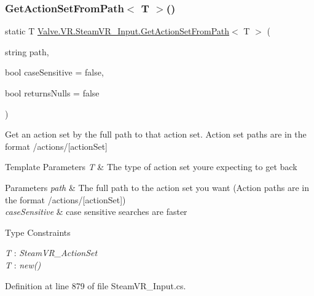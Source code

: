 \subsubsection{\texorpdfstring{GetActionSetFromPath$<$ T $>$()}{GetActionSetFromPath< T >()}}
{\footnotesize\ttfamily static T \mbox{\hyperlink{class_valve_1_1_v_r_1_1_steam_v_r___input_ae8457bd35fd6eb86e62371d56af44254}{Valve.\+V\+R.\+Steam\+V\+R\+\_\+\+Input.\+Get\+Action\+Set\+From\+Path}}$<$ T $>$ (\begin{DoxyParamCaption}\item[{string}]{path,  }\item[{bool}]{case\+Sensitive = {\ttfamily false},  }\item[{bool}]{returns\+Nulls = {\ttfamily false} }\end{DoxyParamCaption})\hspace{0.3cm}{\ttfamily [static]}}



Get an action set by the full path to that action set. Action set paths are in the format /actions/\mbox{[}action\+Set\mbox{]} 


\begin{DoxyTemplParams}{Template Parameters}
{\em T} & The type of action set you\textquotesingle{}re expecting to get back\\
\hline
\end{DoxyTemplParams}

\begin{DoxyParams}{Parameters}
{\em path} & The full path to the action set you want (Action paths are in the format /actions/\mbox{[}action\+Set\mbox{]})\\
\hline
{\em case\+Sensitive} & case sensitive searches are faster\\
\hline
\end{DoxyParams}
\begin{Desc}
\item[Type Constraints]\begin{description}
\item[{\em T} : {\em Steam\+V\+R\+\_\+\+Action\+Set}]\item[{\em T} : {\em new()}]\end{description}
\end{Desc}


Definition at line 879 of file Steam\+V\+R\+\_\+\+Input.\+cs.

\mbox{\label{class_valve_1_1_v_r_1_1_steam_v_r___input_a936c76ec182f18ace45ad74c95ce7629}} 
